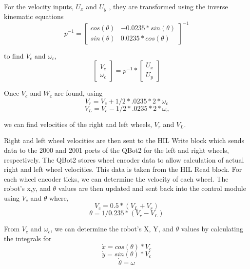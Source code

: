 \documentclass[conference]{IEEEtran}
\begin{document}
For the velocity inputs, $U_x$ and $U_y$ , they are transformed using the inverse kinematic equations
\begin{equation}
			p^{-1}= \begin{bmatrix}cos⁡(\theta) & -0.0235*sin⁡(\theta) \\ sin⁡(\theta) & 0.0235*cos⁡(\theta) \end{bmatrix}^{-1}
\end{equation}
	
to find $V_c$ and $\omega_c$,
\begin{equation}
\begin{bmatrix} V_c \\ \omega_c \end{bmatrix}=p^{-1}*\begin{bmatrix}U_x \\ U_y\end{bmatrix}
\end{equation}	

Once $V_c$ and $W_c$ are found, using
\begin{equation}
V_r=V_c+1/2* .0235*2*\omega_c
\end{equation}
\begin{equation}
	V_L=V_c-1/2* .0235*2*\omega_c
\end{equation}
	

	
we can find velocities of the right and left wheels, $V_r$ and $V_L$.

Right and left wheel velocities are then sent to the HIL Write block which sends data to the 2000 and 2001 ports of the QBot2 for the left and right wheels, respectively.
The QBot2 stores wheel encoder data to allow calculation of actual right and left wheel velocities. This data is taken from the HIL Read block. For each wheel encoder ticks, we can determine the velocity of each wheel. The robot’s x,y, and $\theta$ values are then updated and sent back into the control module using $V_c$ and $\theta$ where,
\begin{equation}
V_c=0.5*(V_L+V_r)
\end{equation}
\begin{equation}
\theta=1/0.235*(V_r-V_L)
\end{equation}
	

	


From $V_c$ and $\omega_c$, we can determine the robot’s X, Y, and $\theta$ values by calculating the integrals for
\begin{equation}
\dot{x} =cos⁡(\theta)*V_c
\end{equation}
\begin{equation}
\dot{y}=sin⁡(\theta)*V_c
\end{equation}
\begin{equation}
	\dot\theta= \omega	
\end{equation}
\end{document}

